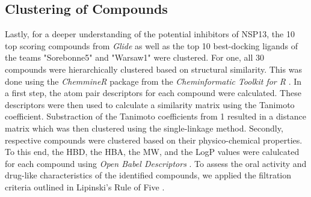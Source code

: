 \documentclass[11pt, letterpaper, titlepage]{article}
\renewcommand{\cite}{\parencite}
\begin{document}
\subsection{Clustering of Compounds}
Lastly, for a deeper understanding of the potential inhibitors of \ac{NSP13}, the 10 top scoring compounds from \textit{Glide} as well as the top 10 best-docking ligands of the teams "Sorebonne5" and "Warsaw1" were clustered. For one, all 30 compounds were hierarchically clustered based on structural similarity. This was done using the \textit{ChemmineR} package from the \textit{Cheminformatic Toolkit for R} \cite{ChemmineR}. In a first step, the atom pair descriptors for each compound were calculated. These descriptors were then used to calculate a similarity matrix using the Tanimoto coefficient. Substraction of the Tanimoto coefficients from 1 resulted in a distance matrix which was then clustered using the single-linkage method. 
Secondly, respective compounds were clustered based on their physico-chemical properties. To this end, the \ac{HBD}, the \ac{HBA}, the \ac{MW}, and the \ac{LogP} values were calulcated for each compound using \textit{Open Babel Descriptors} \cite{ChemmineOB}. To assess the oral activity and drug-like characteristics of the identified compounds, we applied the filtration criteria outlined in Lipinski's Rule of Five \cite{Lipinski_1997}. 
\end{document}

